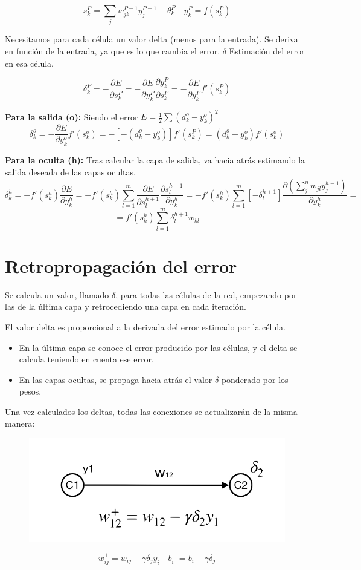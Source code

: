 \documentclass[12pt, twoside, openright]{report} %
\begin{document}
$$s^P_k= \sum_j w^{P-1}_{jk}y^{P-1}_j+\theta_k^P \quad y^P_k=f(s^P_k)$$

Necesitamos para cada célula un valor delta (menos para la entrada). Se deriva en función de la entrada, ya que es lo que cambia el error. $\delta$ Estimación del error en esa célula.

$$\delta^P_k=-\frac{\partial E}{\partial s^P_k}=-\frac{\partial E}{\partial y^P_k}\frac{\partial y^P_k}{\partial s^P_k}=-\frac{\partial E}{\partial y^P_k}f'(s^P_k)$$

\textbf{Para la salida (o):} Siendo el error $E=\frac 1 2 \sum (d^o_k-y^o_k)^2$
$$\delta^o_k=-\frac{\partial E}{\partial y^o_k}f'(s^o_k)=-[-(d^o_k-y^o_k)]f'(s^P_k)=(d^o_k-y^o_k)f'(s^o_k)$$

\textbf{Para la oculta (h):} Tras calcular la capa de salida, va hacia atrás estimando la salida deseada de las capas ocultas.
$$\delta^h_k=-f'(s^h_k)\frac{\partial E}{\partial y^h_k}=-f'(s^h_k)\sum^{m}_{l=1}\frac{\partial E}{\partial s^{h+1}_l}\frac{\partial s^{h+1}_l}{\partial y^h_k}=-f'(s^h_k)\sum^{m}_{l=1}[-\delta^{h+1}_l]\frac{\partial (\sum_j^n w_{jl}y^{h-1}_j)}{\partial y^h_k}=$$ $$=f'(s^h_k)\sum^{m}_{l=1}\delta^{h+1}_l w_{kl}$$
\pagebreak

\section{Retropropagación del error}
Se calcula un valor, llamado $\delta$, para todas las células de la red, empezando por las de la última capa y retrocediendo una capa en cada iteración.

El valor delta es proporcional a la derivada del error estimado por la célula.
\begin{itemize}
	\item En la última capa se conoce el error producido por las células, y el delta se calcula teniendo en cuenta ese error.
	\item En las capas ocultas, se propaga hacia atrás el valor $\delta$ ponderado por los pesos.
\end{itemize}

Una vez calculados los deltas, todas las conexiones se actualizarán de la misma manera: 
\begin{figure}[H]
	{\includegraphics[scale=.35]{regla-delta.jpg}}
\end{figure}
$$w^+_{ij} = w_{ij}-\gamma \delta_j y_i \quad b^+_{i}=b_i - \gamma \delta_j$$
\end{document}
